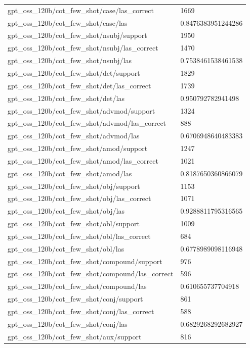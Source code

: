 \begin{tabular}{ll}
gpt\_oss\_120b/cot\_few\_shot/case/las\_correct & 1669 \\
gpt\_oss\_120b/cot\_few\_shot/case/las & 0.8476383951244286 \\
gpt\_oss\_120b/cot\_few\_shot/nsubj/support & 1950 \\
gpt\_oss\_120b/cot\_few\_shot/nsubj/las\_correct & 1470 \\
gpt\_oss\_120b/cot\_few\_shot/nsubj/las & 0.7538461538461538 \\
gpt\_oss\_120b/cot\_few\_shot/det/support & 1829 \\
gpt\_oss\_120b/cot\_few\_shot/det/las\_correct & 1739 \\
gpt\_oss\_120b/cot\_few\_shot/det/las & 0.950792782941498 \\
gpt\_oss\_120b/cot\_few\_shot/advmod/support & 1324 \\
gpt\_oss\_120b/cot\_few\_shot/advmod/las\_correct & 888 \\
gpt\_oss\_120b/cot\_few\_shot/advmod/las & 0.6706948640483383 \\
gpt\_oss\_120b/cot\_few\_shot/amod/support & 1247 \\
gpt\_oss\_120b/cot\_few\_shot/amod/las\_correct & 1021 \\
gpt\_oss\_120b/cot\_few\_shot/amod/las & 0.8187650360866079 \\
gpt\_oss\_120b/cot\_few\_shot/obj/support & 1153 \\
gpt\_oss\_120b/cot\_few\_shot/obj/las\_correct & 1071 \\
gpt\_oss\_120b/cot\_few\_shot/obj/las & 0.9288811795316565 \\
gpt\_oss\_120b/cot\_few\_shot/obl/support & 1009 \\
gpt\_oss\_120b/cot\_few\_shot/obl/las\_correct & 684 \\
gpt\_oss\_120b/cot\_few\_shot/obl/las & 0.6778989098116948 \\
gpt\_oss\_120b/cot\_few\_shot/compound/support & 976 \\
gpt\_oss\_120b/cot\_few\_shot/compound/las\_correct & 596 \\
gpt\_oss\_120b/cot\_few\_shot/compound/las & 0.610655737704918 \\
gpt\_oss\_120b/cot\_few\_shot/conj/support & 861 \\
gpt\_oss\_120b/cot\_few\_shot/conj/las\_correct & 588 \\
gpt\_oss\_120b/cot\_few\_shot/conj/las & 0.6829268292682927 \\
gpt\_oss\_120b/cot\_few\_shot/aux/support & 816 \\

\end{tabular}
